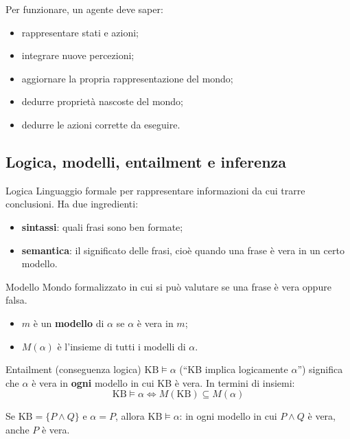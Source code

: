 \documentclass[11pt, a4paper]{article}
\newcommand{\KB}{\mathrm{KB}}
\begin{document}
Per funzionare, un agente deve saper:
\begin{itemize}
  \item rappresentare stati e azioni;
  \item integrare nuove percezioni;
  \item aggiornare la propria rappresentazione del mondo;
  \item dedurre proprietà nascoste del mondo;
  \item dedurre le azioni corrette da eseguire.
\end{itemize}

\subsection{Logica, modelli, entailment e inferenza}

\begin{defbox}{Logica}
  Linguaggio formale per rappresentare informazioni da cui trarre conclusioni. Ha due ingredienti:
  \begin{itemize}
    \item \textbf{sintassi}: quali frasi sono ben formate;
    \item \textbf{semantica}: il significato delle frasi, cioè quando una frase è vera in un certo modello.
  \end{itemize}
\end{defbox}

\begin{defbox}{Modello}
  Mondo formalizzato in cui si può valutare se una frase è vera oppure falsa.
  \begin{itemize}
    \item $m$ è un \textbf{modello} di $\alpha$ se $\alpha$ è vera in $m$;
    \item $M(\alpha)$ è l'insieme di tutti i modelli di $\alpha$.
  \end{itemize}
\end{defbox}

\begin{defbox}{Entailment (conseguenza logica)}
  $\KB \models \alpha$ (``KB implica logicamente $\alpha$'') significa che $\alpha$ è vera in \textbf{ogni} modello in cui KB è vera. In termini di insiemi:
  \[
    \KB \models \alpha \iff M(\KB) \subseteq M(\alpha)
  \]
\end{defbox}

\begin{esempio}
  Se $\KB = \{P \land Q\}$ e $\alpha = P$, allora $\KB \models \alpha$: in ogni modello in cui $P \land Q$ è vera, anche $P$ è vera.
\end{esempio}
\end{document}
